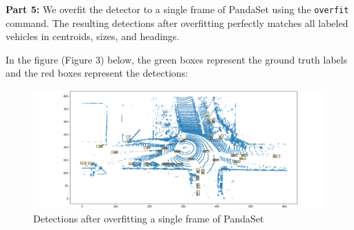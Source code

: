 \documentclass[letter]{article}
\begin{document}
	\textbf{Part 5:} We overfit the detector to a single frame of PandaSet using the \verb|overfit| command. The resulting detections after overfitting perfectly matches all labeled vehicles in centroids, sizes, and headings. 

	In the figure (Figure 3) below, the green boxes represent the ground truth labels and the red boxes represent the detections:

	\begin{figure}[h]
		\centering
		\includegraphics[width=\linewidth]{images/det_overfit.png}
		\caption{Detections after overfitting a single frame of PandaSet}
		\label{Label}
	\end{figure}
	
\end{document}
